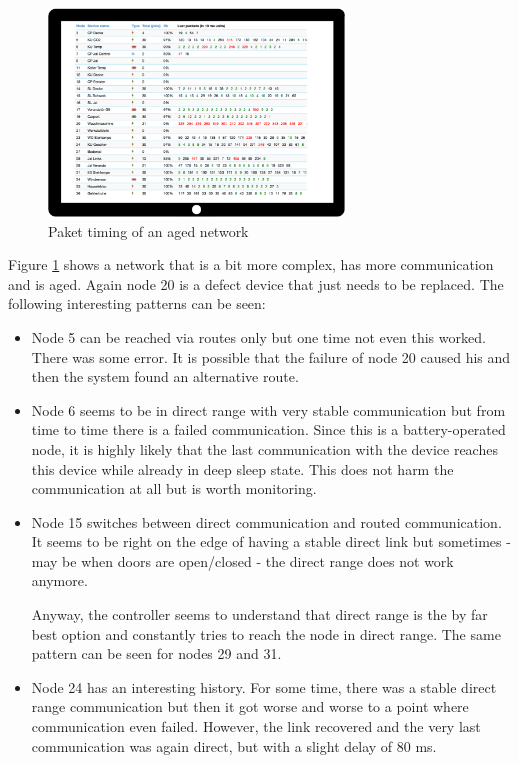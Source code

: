 \begin{figure}
\begin{center}
\includegraphics[width=0.7\textwidth]{pngs/cap8/c5timinginfo2.png}
\caption{Paket timing of an aged \zwave network}
\label{c5:snifferaged}
\end{center}
\end{figure}

Figure \ref{c5:snifferaged} shows a network that is a bit more complex, has more 
communication and is aged. Again node 20 is a defect device that just needs to be 
replaced. The following interesting patterns can be seen:

\begin{itemize}
\item Node 5 can be reached via routes only but one time not even this worked. There was 
some error. It is possible that the failure of node 20 caused his and then the system 
found an alternative route.
\item Node 6 seems to be in direct range with very stable communication but from time 
to time there is a failed communication. Since this is a battery-operated node, it is 
highly likely that the last communication with the device reaches this device while already 
in deep sleep state. This does not harm the communication at all but is worth monitoring.
\item Node 15 switches between direct communication and routed communication. It seems 
to be right on the edge of having a stable direct link but sometimes - may be when doors 
are open/closed - the direct range does not work anymore.


Anyway, the controller seems to understand that direct range is the by far best option and 
constantly tries to reach the node in direct range. The same pattern can be seen for nodes 29 and 31.
\item Node 24 has an interesting history. For some time, there was a stable direct range 
communication but then it got worse and worse to a point where communication even failed. 
However, the link recovered and the very last communication was again direct, but with a 
slight delay of 80 ms.
\end{itemize}


